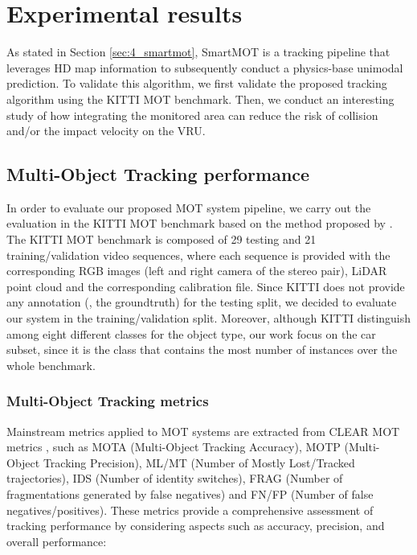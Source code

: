 \section{Experimental results}
\label{sec:4_mot_and_euroncap}

As stated in Section \ref{sec:4_smartmot}, SmartMOT is a tracking pipeline that leverages HD map information to subsequently conduct a physics-base unimodal prediction. To validate this algorithm, we first validate the proposed tracking algorithm using the KITTI \ac{MOT} benchmark. Then, we conduct an interesting study of how integrating the monitored area can reduce the risk of collision and/or the impact velocity on the \ac{VRU}.

\subsection{Multi-Object Tracking performance}
\label{subsec:4_mot_results}

In order to evaluate our proposed \ac{MOT} system pipeline, we carry out the evaluation in the KITTI \ac{MOT} benchmark based on the method proposed by \cite{weng20203d}. The KITTI MOT benchmark is composed of 29 testing and 21 training/validation video sequences, where each sequence is provided with the corresponding RGB images (left and right camera of the stereo pair), LiDAR point cloud and the corresponding calibration file. Since KITTI does not provide any annotation (\ie, the groundtruth) for the testing split, we decided to evaluate our system in the training/validation split. Moreover, although KITTI distinguish among eight different classes for the object type, our work focus on the car subset, since it is the class that contains the most number of instances over the whole benchmark.

\subsubsection{Multi-Object Tracking metrics}
\label{subsubsec:4_mot_metrics}

Mainstream metrics applied to MOT systems are extracted from CLEAR MOT metrics \cite{bernardin2008evaluating}, such as MOTA (Multi-Object Tracking Accuracy), MOTP (Multi-Object Tracking Precision), ML/MT (Number of Mostly Lost/Tracked trajectories), IDS (Number of identity switches), FRAG (Number of fragmentations generated by false negatives) and FN/FP (Number of false negatives/positives). These metrics provide a comprehensive assessment of tracking performance by considering aspects such as accuracy, precision, and overall performance:

